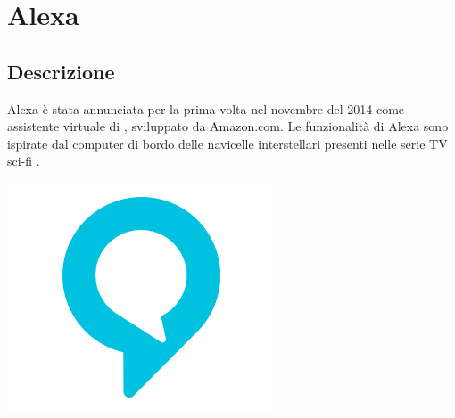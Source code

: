 \documentclass[a4paper,titlepage]{article}
\begin{document}
\newpage
	\section{Alexa}
	\subsection{Descrizione}
	\begin{minipage}{0.7\textwidth}\raggedright
		Alexa è stata annunciata per la prima volta nel novembre del 2014 come assistente virtuale di , sviluppato da Amazon.com.
		Le funzionalità di Alexa sono ispirate dal computer di bordo delle navicelle interstellari presenti nelle serie TV sci-fi .

	\end{minipage}
	\hfill
	\noindent\begin{minipage}{0.1\textwidth}
		\includegraphics[scale=0.3]{images/alexa.png}
	\end{minipage}
\end{document}
